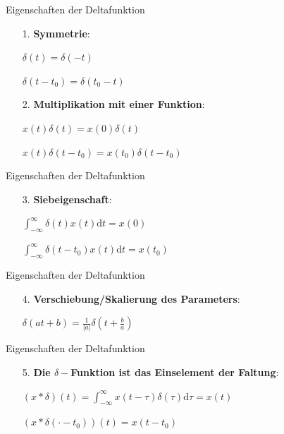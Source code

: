 \documentclass[14pt, aspectratio=169, handout]{beamer}
\begin{document}
\begin{frame}{Eigenschaften der Deltafunktion}
    \begin{itemize}
        \item[1.] \textbf{Symmetrie}: 
        \item[] $\delta(t) = \delta(-t)$
        \item[] $\delta(t-t_0) = \delta(t_0 - t)$
        \item[] 
        \item[2.] \textbf{Multiplikation mit einer Funktion}: \item[] $x(t)\delta(t) = x(0)\delta(t)$
        \item[] $x(t)\delta(t-t_0)=x(t_0)\delta(t-t_0)$
    \end{itemize}
\end{frame}

\begin{frame}{Eigenschaften der Deltafunktion}
    \begin{itemize}
        \item[3.] \textbf{Siebeigenschaft}: 
        \item[] $\displaystyle\int_{-\infty}^{\infty}\delta(t)x(t)\text{d}t = x(0)$
        \item[] $\displaystyle\int_{-\infty}^{\infty}\delta(t-t_0)x(t)\text{d}t = x(t_0)$
    \end{itemize}
\end{frame}

\begin{frame}{Eigenschaften der Deltafunktion}
    \begin{itemize}
        \item[4.] \textbf{Verschiebung/Skalierung des Parameters}:
    \item[] $\delta(at + b) = \displaystyle\frac{1}{|a|}\delta\left(t + \displaystyle\frac{b}{a} \right)$
    \end{itemize}
\end{frame}

\begin{frame}{Eigenschaften der Deltafunktion}
    \begin{itemize}
        \item[5.] \textbf{Die $\delta-$Funktion ist das Einselement der Faltung}:
        \item[] $(x \ast \delta)(t) = \displaystyle\int_{-\infty}^\infty x(t-\tau)\delta(\tau)\text{d}\tau = x(t)$
        \item[] $(x \ast \delta(\cdot - t_0))(t) = x(t - t_0)$
    \end{itemize}
\end{frame}
\end{document}
